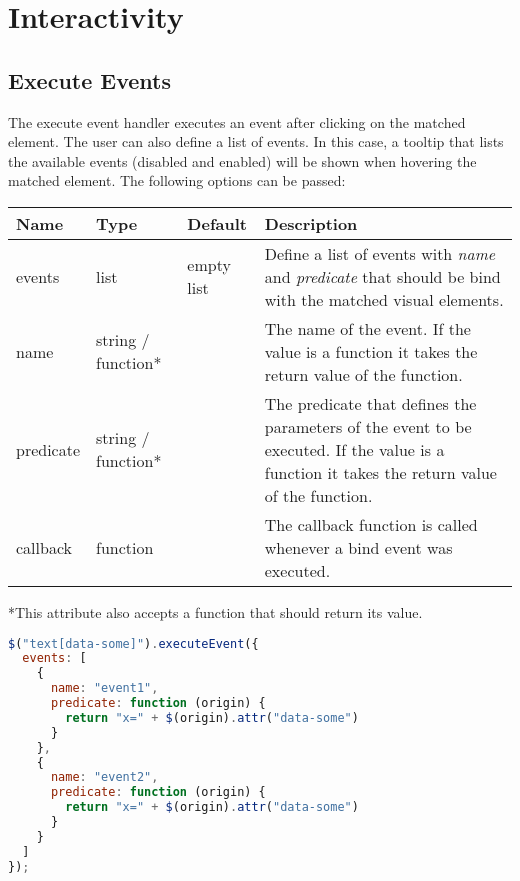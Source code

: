 \pagebreak

\section{Interactivity}
\label{sec:interactivity}

\subsection{Execute Events}
\label{sec:execute_events}

The execute event handler executes an event after clicking on the matched element.
The user can also define a list of events.
In this case, a tooltip that lists the available events (disabled and enabled) will be shown when hovering the matched element.
The following options can be passed:

\vspace{0.5cm}
\begin{tabular}{ l l l p{7cm} }
  \textbf{Name} & \textbf{Type} & \textbf{Default} & \textbf{Description} \\
  \hline\noalign{\medskip}
  events & list & empty list & Define a list of events with \textit{name} and \textit{predicate} that should be bind with the matched visual elements. \\
  \hline\noalign{\medskip}
  \hspace{0.5cm} name & string / function* & & The name of the event. If the value is a function it takes the return value of the function.\\
  \hline\noalign{\medskip}
  \hspace{0.5cm}  predicate & string / function* & & The predicate that defines the parameters of the event to be executed. If the value is a function it takes the return value of the function.\\
  \hline\noalign{\medskip}
  callback & function &  & The callback function is called whenever a bind event was executed.
\end{tabular}

*This attribute also accepts a function that should return its value.

\begin{lstlisting}[float=ht!,language=JavaScript]
$("text[data-some]").executeEvent({
  events: [
    { 
      name: "event1", 
      predicate: function (origin) {
        return "x=" + $(origin).attr("data-some") 
      }
    },
    {
      name: "event2", 
      predicate: function (origin) {
        return "x=" + $(origin).attr("data-some")
      }
    } 
  ]
});
\end{lstlisting}
